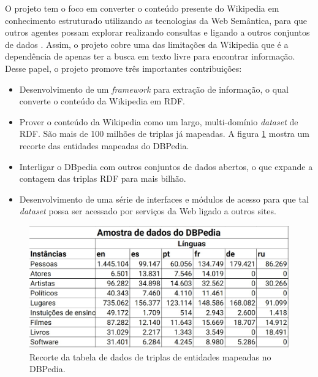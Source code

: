 O projeto tem o foco em converter o conteúdo presente do Wikipedia em conhecimento estruturado utilizando as tecnologias da Web Semântica, para que outros agentes possam explorar realizando consultas e ligando a outros conjuntos de dados \citep{Auer:2007:DNW:1785162.1785216}. Assim, o projeto cobre uma das limitações da Wikipedia que é a dependência de apenas ter a busca em texto livre para encontrar informação. Desse papel, o projeto promove três importantes contribuições:

\begin{itemize}
	\item{Desenvolvimento de um \textit{framework} para extração de informação, o qual converte o conteúdo da Wikipedia em RDF.} 

	\item{Prover o conteúdo da Wikipedia como um largo, multi-domínio \textit{dataset} de RDF. São mais de 100 milhões de triplas já mapeadas. A figura \ref{fig:dbpedia-triples} mostra um recorte das entidades mapeadas do DBPedia.}
	
	\item{Interligar o DBpedia com outros conjuntos de dados abertos, o que expande a contagem das triplas RDF para mais bilhão.}
	
	\item{Desenvolvimento de uma série de interfaces e módulos de acesso para que tal \textit{dataset} possa ser acessado por serviços da Web ligado a outros sites.}	
\end{itemize}

\begin{figure}
	\centering
	\includegraphics[scale=0.45]{imagens/dbpedia_triples.jpg}
	\caption{Recorte da tabela de dados de triplas de entidades mapeadas no DBPedia. \citep{DBPedia:2014}}
	\label{fig:dbpedia-triples}
\end{figure}

